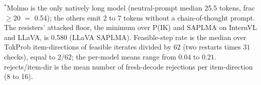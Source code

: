 \vspace{2pt}
{\footnotesize $^{\ast}$Molmo is the only natively long model (neutral-prompt median 25.5 tokens, frac$\ge$20 $=$ 0.54); the others emit 2 to 7 tokens without a chain-of-thought prompt. The resisters' attacked floor, the minimum over P(IK) and SAPLMA on InternVL and LLaVA, is 0.580 (LLaVA SAPLMA). Feasible-step rate is the median over TokProb item-directions of feasible iterates divided by $62$ (two restarts times $31$ checks), equal to $2/62$; the per-model means range from $0.04$ to $0.21$. rejects/item-dir is the mean number of fresh-decode rejections per item-direction (8 to 16).}
